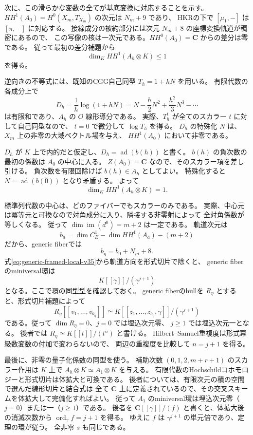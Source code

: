 次に、この滑らかな変数の全てが基底変換に対応することを示す。
$HH^1(A_0)=H^0(X_m,T_{X_m})$ の次元は $N_m+9$ であり、
HKRの下で $[\mu_1,-]$ は $[\pi,-]$ に対応する。
接線成分の被約部分には次元 $N_m+8$ の座標変換軌道が稠密にあるので、
この写像の核は一次元である。$HH^0(A_0)=\mathbf C$ からの差分は零である。
従って最初の差分補題から
\[
 \dim_K HH^1(A_h\otimes K)\le1
\]
を得る。

逆向きの不等式には、既知のCGG自己同型 $T_h=1+hN$ を用いる。
有限代数の各成分上で
\[
 D_h=\frac1h\log(1+hN)
       =N-\frac h2N^2+\frac{h^2}{3}N^3-\cdots
\]
は有限和であり、$A_h$ の $O$ 線形導分である。
実際、$T_h^t$ が全てのスカラー $t$ に対して自己同型なので、
$t=0$ で微分して $\log T_h$ を得る。
$D_h$ の特殊化 $N$ は、$X_m$ 上の非零の大域ベクトル場を与え、
$HH^1(A_0)$ において非零である。

$D_h$ が $K$ 上で内的だと仮定し、$D_h=\operatorname{ad}(b(h))$ と書く。
$b(h)$ の負次数の最初の係数は $A_0$ の中心に入る。
$Z(A_0)=\mathbf C$ なので、そのスカラー項を差し引ける。
負次数を有限回除けば $b(h)\in A_h$ としてよい。
特殊化すると $N=\operatorname{ad}(b(0))$ となり矛盾する。
よって
\[
 \boxed{\dim_K HH^1(A_h\otimes K)=1}.
\]

標準列代数の中心は、どのファイバーでもスカラーのみである。
実際、中心元は冪等元と可換なので対角成分に入り、隣接する非零射によって
全対角係数が等しくなる。
従って $\dim\operatorname{im}(d^0)=m+2$ は一定である。
軌道次元は
\[
 b_a=\dim C_E^1-\dim HH^1(A_a)-(m+2)
\]
だから、generic fiberでは
\[
 b_\eta=b_0+N_m+8.
\]
式\eqref{eq:generic-framed-local-v35}から軌道方向を形式切片で除くと、
generic fiberのminiversal環は
\[
 K[[\gamma]]/(\gamma^{j+1})
\]
となる。ここで環の同型型を確認しておく。
generic fiberのhullを $R_\eta$ とすると、形式切片補題によって
\[
 R_\eta[[v_1,\ldots,v_{b_\eta}]]
 \simeq K[[z_1,\ldots,z_{b_\eta},\gamma]]/(\gamma^{j+1})
\]
である。従って $\dim R_\eta=0$、$j=0$ では埋込次元零、
$j\ge1$ では埋込次元一となる。
後者では $R_\eta\simeq K[[t]]/(t^n)$ と書ける。
Hilbert--Samuel重複度は形式冪級数変数の付加で変わらないので、
両辺の重複度を比較して $n=j+1$ を得る。

最後に、非零の量子化係数の同型を使う。
補助次数 $(0,1,2,m+r+1)$ のスカラー作用は $K$ 上で
$A_h\otimes K\simeq A_1\otimes K$ を与える。
有限代数のHochschildコホモロジーと形式切片は体拡大と可換である。
後者については、有限次元の積の空間で選んだ線形切片と結合式は
全て $\mathbf C$ 上に定義されているので、その交叉スキームを体拡大して完備化すればよい。
従って $A_1$ のminiversal環は埋込次元零（$j=0$）または一（$j\ge1$）である。
後者を $\mathbf C[[\gamma]]/(f)$ と書くと、体拡大後の消滅次数から
$\operatorname{ord}_\gamma f=j+1$ を得る。
ゆえに $f$ は $\gamma^{j+1}$ の単元倍であり、定理の環が従う。
全非零 $s$ も同じである。

